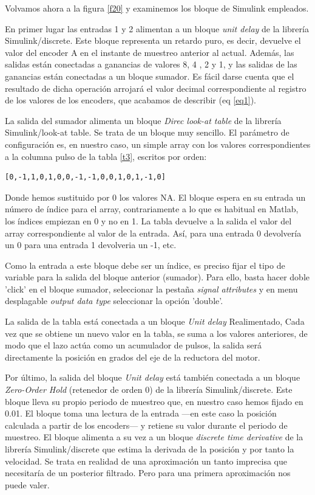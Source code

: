 \documentclass[10pt,a4paper]{report}
\begin{document}
Volvamos ahora a la figura \ref{f20} y examinemos los bloque de Simulink empleados.

En primer lugar las entradas 1 y 2 alimentan a un bloque \emph{unit delay} de la librería Simulink/discrete. Este bloque representa un retardo puro, es decir, devuelve el valor del encoder A en el instante de muestreo anterior al actual. Además, las salidas están conectadas a ganancias de valores 8, 4 , 2 y 1, y las salidas de las ganancias están conectadas a un bloque sumador. Es fácil darse cuenta que el resultado de dicha operación arrojará el valor decimal correspondiente al registro de los valores de los encoders, que acabamos de describir (eq \ref{eq1}).

La salida del sumador alimenta un bloque \emph{Direc look-at table} de la librería Simulink/look-at table. Se trata de un bloque muy sencillo. El parámetro de configuración es, en nuestro caso, un simple array con los valores correspondientes a la columna pulso de la tabla \ref{t3}, escritos por orden:
\begin{verbatim}
[0,-1,1,0,1,0,0,-1,-1,0,0,1,0,1,-1,0]
\end{verbatim}
Donde hemos sustituido por 0 los valores NA. El bloque espera  en su entrada un número de índice para el array, contrariamente a lo que es habitual en Matlab, los índices empiezan en 0 y  no en 1. La tabla devuelve a la salida el valor del array correspondiente al valor de la entrada. Así, para una entrada 0 devolvería un 0 para una entrada 1 devolveria un -1, etc.

Como la entrada a este bloque debe ser un índice, es preciso fijar el tipo de variable para la salida del bloque anterior (sumador). Para ello, basta hacer doble 'click' en el bloque sumador, seleccionar la pestaña \emph{signal attributes} y en menu desplagable \emph{output data type} seleccionar la opción 'double'. 

La salida de la tabla está conectada a un bloque \emph{Unit delay} Realimentado, Cada vez que se obtiene un nuevo valor en la tabla, se suma a los valores anteriores, de modo que el lazo actúa como un acumulador de pulsos, la salida será directamente la posición en grados del eje de la reductora del motor.

Por último, la salida del bloque \emph{Unit delay} está también conectada a un bloque \emph{Zero-Order Hold} (retenedor de orden 0) de la librería Simulink/discrete. Este bloque lleva su propio periodo de muestreo que, en nuestro caso hemos fijado en 0.01. El bloque toma una lectura de la entrada ---en este caso la posición calculada a partir de los encoders--- y retiene su valor durante el periodo de muestreo. El bloque alimenta a su vez a un bloque \emph{discrete time derivative} de la librería Simulink/discrete que estima la derivada de la posición y por tanto la velocidad. Se trata en realidad de una aproximación un tanto imprecisa que necesitaría de un posterior filtrado. Pero para una primera aproximación nos puede valer.
\end{document}
